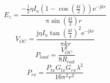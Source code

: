 \documentclass{article}
\begin{document}
    \begin{equation}
        E_{z}=\frac{-\frac{\mathrm{j}}{2} \eta  I_{a} \left(1-\cos \! \left(\frac{k l}{2}\right)\right) {\mathrm e}^{\mathrm{-j} k r}}{\mathrm{\pi} \sin \! \left(\frac{k l}{2}\right) r}
    \end{equation}
    \begin{equation}
        V_{\mathit{OC}}=\frac{\mathrm{j} \eta  I_{a} \tan \! \left(\frac{k l}{4}\right)^{2} {\mathrm e}^{\mathrm{-j} k r}}{\mathrm{\pi} k r}
    \end{equation}
    \begin{equation}
        P_{\mathit{load}}=\frac{V_{\mathit{OC}}^{2}}{8 R_{\mathit{rad}}}
    \end{equation}
    \begin{equation}
        P_{\mathit{rx}}=\frac{P_{\mathit{tx}} G_{\mathit{tx}} G_{\mathit{rx}} \lambda^{2}}{16 \mathrm{\pi}^{2} r^{2}}
    \end{equation}
\end{document}
